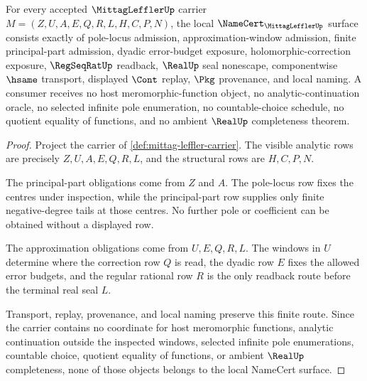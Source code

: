 \begin{theorem}
\label{thm:mittag-leffler-namecert-obligations}
For every accepted $\MittagLefflerUp$ carrier $M=(Z,U,A,E,Q,R,L,H,C,P,N)$, the local $\NameCert_{\MittagLefflerUp}$ surface consists exactly of pole-locus admission, approximation-window admission, finite principal-part admission, dyadic error-budget exposure, holomorphic-correction exposure, $\RegSeqRatUp$ readback, $\RealUp$ seal nonescape, componentwise $\hsame$ transport, displayed $\Cont$ replay, $\Pkg$ provenance, and local naming. A consumer receives no host meromorphic-function object, no analytic-continuation oracle, no selected infinite pole enumeration, no countable-choice schedule, no quotient equality of functions, and no ambient $\RealUp$ completeness theorem.
\end{theorem}
\begin{proof}
Project the carrier of \autoref{def:mittag-leffler-carrier}. The visible analytic rows are precisely $Z,U,A,E,Q,R,L$, and the structural rows are $H,C,P,N$.

The principal-part obligations come from $Z$ and $A$. The pole-locus row fixes the centres under inspection, while the principal-part row supplies only finite negative-degree tails at those centres. No further pole or coefficient can be obtained without a displayed row.

The approximation obligations come from $U,E,Q,R,L$. The windows in $U$ determine where the correction row $Q$ is read, the dyadic row $E$ fixes the allowed error budgets, and the regular rational row $R$ is the only readback route before the terminal real seal $L$.

Transport, replay, provenance, and local naming preserve this finite route. Since the carrier contains no coordinate for host meromorphic functions, analytic continuation outside the inspected windows, selected infinite pole enumerations, countable choice, quotient equality of functions, or ambient $\RealUp$ completeness, none of those objects belongs to the local NameCert surface.
\end{proof}

